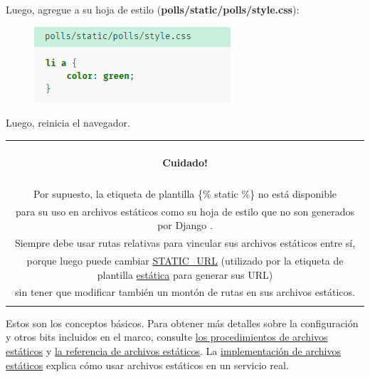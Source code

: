 \documentclass[10pt]{article}
\newcommand{\django}[1]{{\textcolor{G}{Django} #1}}
\begin{document}
Luego, agregue a su hoja de estilo (\textbf{polls/static/polls/style.css}):
\begin{figure}[H]
\begin{center}
\includegraphics[scale=1]{figuras/3/36/361/img1.png}
\end{center}
\end{figure}
Luego, reinicia el navegador.
\begin{table}[H]
	\begin{tabular}{||c||}
	\hline \\
	\begin{Large}
	\textbf{Cuidado!}
	\end{Large}
	\\\\		
	
Por supuesto, la etiqueta de plantilla \textcolor{R}{\{\% static \%\}} no está disponible\\ para su uso en archivos estáticos como su hoja de estilo que no son generados por \django{}.\\ Siempre debe usar rutas relativas para vincular sus archivos estáticos entre sí,\\ porque luego puede cambiar {\href{https://docs.djangoproject.com/en/3.0/ref/settings/\#std:setting-STATIC\_URL}{\textcolor{B}{STATIC\_URL}}}
 (utilizado por la etiqueta de plantilla {\href{https://docs.djangoproject.com/en/3.0/ref/templates/builtins/\#std:templatetag-static}{\textcolor{B}{estática}}} para generar sus URL)\\ sin tener que modificar también un montón de rutas en sus archivos estáticos.
	\\\\ \hline 	
	\end{tabular}			
\end{table}		


Estos son los conceptos básicos. Para obtener más detalles sobre la configuración y otros bits incluidos en el marco, consulte {\href{https://docs.djangoproject.com/en/3.0/howto/static-files/}{\textcolor{B}{los procedimientos de archivos estáticos}}} y {\href{https://docs.djangoproject.com/en/3.0/ref/contrib/staticfiles/}{\textcolor{B}{la referencia de archivos estáticos}}}. La {\href{https://docs.djangoproject.com/en/3.0/howto/static-files/deployment/}{\textcolor{B}{implementación de archivos estáticos}}} explica cómo usar archivos estáticos en un servicio real.
\end{document}
